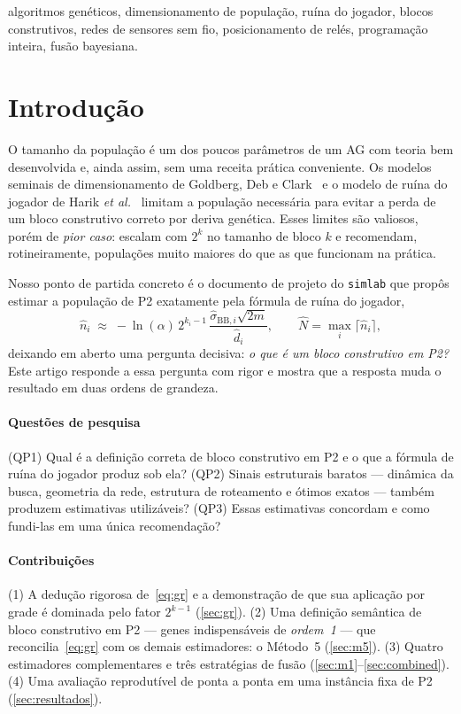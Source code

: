 \documentclass[conference]{IEEEtran}
\newcommand{\Nhat}{\hat{N}}
\begin{document}
\begin{IEEEkeywords}
algoritmos genéticos, dimensionamento de população, ruína do jogador, blocos
construtivos, redes de sensores sem fio, posicionamento de relés, programação
inteira, fusão bayesiana.
\end{IEEEkeywords}

\section{Introdução}
\label{sec:intro}
O tamanho da população é um dos poucos parâmetros de um AG com teoria bem
desenvolvida e, ainda assim, sem uma receita prática conveniente. Os modelos
seminais de dimensionamento de Goldberg, Deb e Clark~\cite{goldberg1992sizing} e o
modelo de ruína do jogador de Harik \emph{et al.}~\cite{harik1999gambler} limitam a
população necessária para evitar a perda de um bloco construtivo correto por
deriva genética. Esses limites são valiosos, porém de \emph{pior caso}: escalam com
$2^{k}$ no tamanho de bloco $k$ e recomendam, rotineiramente, populações muito
maiores do que as que funcionam na prática.

Nosso ponto de partida concreto é o documento de projeto do \texttt{simlab} que
propôs estimar a população de P2 exatamente pela fórmula de ruína do jogador,
\begin{equation}
\widehat{n}_i \;\approx\; -\ln(\alpha)\,2^{k_i-1}\,
\frac{\widehat{\sigma}_{\mathrm{BB},i}\sqrt{2m}}{\widehat{d}_i},
\qquad \Nhat=\max_i\lceil \widehat{n}_i\rceil,
\label{eq:gr}
\end{equation}
deixando em aberto uma pergunta decisiva: \emph{o que é um bloco construtivo em
P2?} Este artigo responde a essa pergunta com rigor e mostra que a resposta muda
o resultado em duas ordens de grandeza.

\paragraph*{Questões de pesquisa}
(QP1) Qual é a definição correta de bloco construtivo em P2 e o que a fórmula de
ruína do jogador produz sob ela? (QP2) Sinais estruturais baratos
--- dinâmica da busca, geometria da rede, estrutura de roteamento e ótimos exatos
--- também produzem estimativas utilizáveis? (QP3) Essas estimativas concordam e
como fundi-las em uma única recomendação?

\paragraph*{Contribuições}
(1) A dedução rigorosa de~\eqref{eq:gr} e a demonstração de que sua aplicação por
grade é dominada pelo fator $2^{k-1}$ (\autoref{sec:gr}). (2) Uma definição
semântica de bloco construtivo em P2 --- genes indispensáveis de \emph{ordem~1} ---
que reconcilia~\eqref{eq:gr} com os demais estimadores: o Método~5
(\autoref{sec:m5}). (3) Quatro estimadores complementares e três estratégias de
fusão (\autoref{sec:m1}--\autoref{sec:combined}). (4) Uma avaliação reprodutível
de ponta a ponta em uma instância fixa de P2 (\autoref{sec:resultados}).
\end{document}

